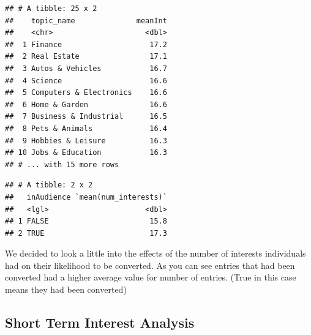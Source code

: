 \documentclass[]{article}
\newenvironment{Shaded}{\begin{snugshade}}{\end{snugshade}}
\newcommand{\DataTypeTok}[1]{\textcolor[rgb]{0.13,0.29,0.53}{#1}}
\newcommand{\KeywordTok}[1]{\textcolor[rgb]{0.13,0.29,0.53}{\textbf{#1}}}
\newcommand{\NormalTok}[1]{#1}
\newcommand{\OperatorTok}[1]{\textcolor[rgb]{0.81,0.36,0.00}{\textbf{#1}}}
\newcommand{\StringTok}[1]{\textcolor[rgb]{0.31,0.60,0.02}{#1}}
\begin{document}
\begin{verbatim}
## # A tibble: 25 x 2
##    topic_name              meanInt
##    <chr>                     <dbl>
##  1 Finance                    17.2
##  2 Real Estate                17.1
##  3 Autos & Vehicles           16.7
##  4 Science                    16.6
##  5 Computers & Electronics    16.6
##  6 Home & Garden              16.6
##  7 Business & Industrial      16.5
##  8 Pets & Animals             16.4
##  9 Hobbies & Leisure          16.3
## 10 Jobs & Education           16.3
## # ... with 15 more rows
\end{verbatim}

\begin{Shaded}
\end{Shaded}

\begin{verbatim}
## # A tibble: 2 x 2
##   inAudience `mean(num_interests)`
##   <lgl>                      <dbl>
## 1 FALSE                       15.8
## 2 TRUE                        17.3
\end{verbatim}

We decided to look a little into the effects of the number of interests
individuals had on their likelihood to be converted. As you can see
entries that had been converted had a higher average value for number of
entries. (True in this case means they had been converted)

\hypertarget{short-term-interest-analysis}{%
\subsection{Short Term Interest
Analysis}\label{short-term-interest-analysis}}

\begin{Shaded}
\end{Shaded}
\end{document}
